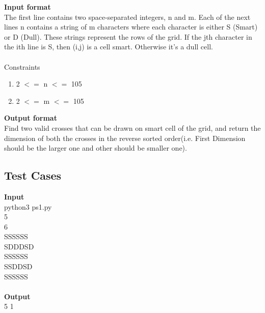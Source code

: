 \documentclass[12pt]{article}
\begin{document}
{{\begin{itemize}
\textbf{Input format} \\
The first line contains two space-separated integers,  n and m. 
Each of the next  lines n contains a string of  m characters where each character is either S (Smart) or D (Dull). These strings represent the rows of the grid. If the jth character in the ith  line is S, then  (i,j) is a  cell smart. Otherwise it's a  dull cell.
\\ \\
Constraints
\begin{enumerate}
	\item 2 $<=$ n $<=$ 105
	\item 2 $<=$ m $<=$ 105
\end{enumerate}


\textbf{Output format} \\
Find two valid crosses that can be drawn on smart cell of the grid, and return the dimension of both the crosses in the reverse sorted order(i.e. First Dimension should be the larger one and other should be smaller one).

\end{itemize}
}

\subsection{Test Cases}
\textbf{Input} \\
python3 ps1.py\\
5\\
6\\
SSSSSS\\
SDDDSD\\
SSSSSS\\
SSDDSD\\
SSSSSS\\
\\
\textbf{Output}\\
5 1\\
\\

}
\end{document}

